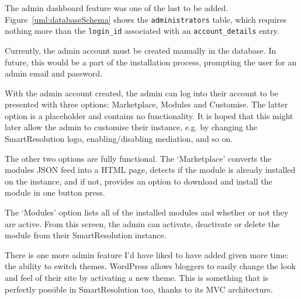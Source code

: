The admin dashboard feature was one of the last to be added. Figure~\ref{uml:databaseSchema} shows the \lstinline{administrators} table, which requires nothing more than the \lstinline{login_id} associated with an \lstinline{account_details} entry.

Currently, the admin account must be created manually in the database. In future, this would be a part of the installation process, prompting the user for an admin email and password.

With the admin account created, the admin can log into their account to be presented with three options: Marketplace, Modules and Customise. The latter option is a placeholder and contains no functionality. It is hoped that this might later allow the admin to customise their instance, e.g. by changing the SmartResolution logo, enabling/disabling mediation, and so on.

The other two options are fully functional. The `Marketplace' converts the modules JSON feed into a HTML page, detects if the module is already installed on the instance, and if not, provides an option to download and install the module in one button press.

The `Modules' option lists all of the installed modules and whether or not they are active. From this screen, the admin can activate, deactivate or delete the module from their SmartResolution instance.

There is one more admin feature I'd have liked to have added given more time: the ability to switch themes. WordPress allows bloggers to easily change the look and feel of their site by activating a new theme. This is something that is perfectly possible in SmartResolution too, thanks to its MVC architecture.